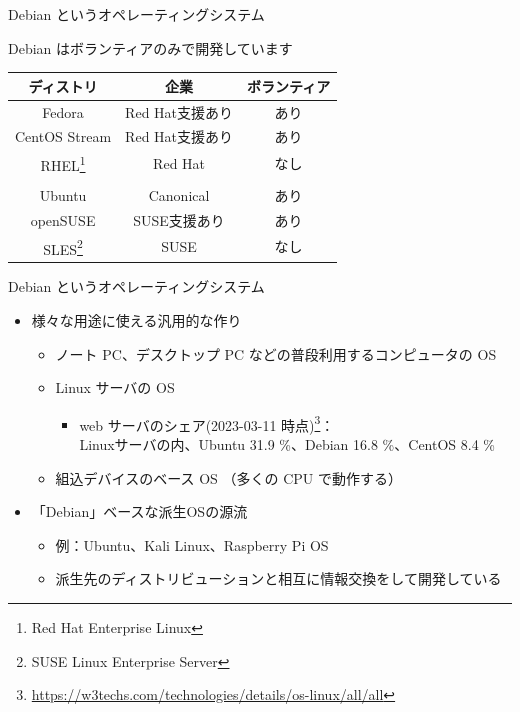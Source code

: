 \begin{frame}{Debian というオペレーティングシステム}

Debian はボランティアのみで開発しています

\begin{table}[htb]
  \begin{tabular}{|c|c|c|}
    \hline
    \textbf{ディストリ} & \textbf{企業}& \textbf{ボランティア} \\ \hline
    Fedora & Red Hat支援あり & あり  \\ \hline
    CentOS Stream & Red Hat支援あり & あり \\ \hline
    RHEL\footnote{Red Hat Enterprise Linux} & Red Hat & なし  \\ \hline
    \color{red}{Debian}  & \color{red}{なし} & \color{red}{あり} \\ \hline
    Ubuntu  & Canonical & あり \\ \hline
    openSUSE & SUSE支援あり & あり \\ \hline
    SLES\footnote{SUSE Linux Enterprise Server} & SUSE & なし \\ \hline
  \end{tabular}
\end{table}

\end{frame}

\begin{frame}{Debian というオペレーティングシステム}

\begin{itemize}
\item 様々な用途に使える汎用的な作り
  \begin{itemize}
  \item ノート PC、デスクトップ PC などの普段利用するコンピュータの OS
  \item Linux サーバの OS
    \begin{itemize}
    \item web サーバのシェア(2023-03-11 時点)\footnote{\url{https://w3techs.com/technologies/details/os-linux/all/all}}：\\ Linuxサーバの内、Ubuntu 31.9 \%、Debian 16.8 \%、CentOS 8.4 \%
    \end{itemize}
  \item 組込デバイスのベース OS （多くの CPU で動作する）
  \end{itemize}
\item 「Debian」ベースな派生OSの源流
  \begin{itemize}
  \item 例：Ubuntu、Kali Linux、Raspberry Pi OS
  \item 派生先のディストリビューションと相互に情報交換をして開発している
  \end{itemize}
\end{itemize}

\end{frame}


